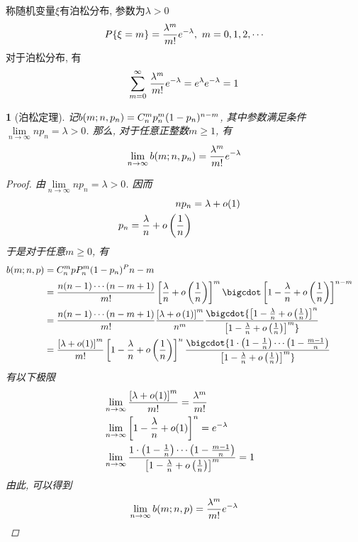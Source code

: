 \begin{poisson_distru}[泊松分布]
称随机变量\(\xi\)有泊松分布, 参数为\(\lambda > 0\)
\begin{align}
P\{\xi = m\} = {\lambda^m\over m!}e^{-\lambda},\,\, m = 0, 1, 2, \cdots
\end{align}
对于泊松分布, 有
\begin{align*}
\sum\limits_{m = 0}^\infty\,{\lambda^m\over m!}e^{-\lambda} = e^\lambda e^{-\lambda} = 1
\end{align*}
\end{poisson_distru}

\newtheorem{poisson_theorem}[theorem_root]{\theorem}
\begin{poisson_theorem}[泊松定理]
记\(b(m; n,p_n) = C_{n}^{m}p^m_n(1-p_n)^{n-m}\), 其中参数满足条件
\(\lim\limits_{n\to\infty}np_n = \lambda > 0\). 那么, 对于任意正整数\(m\ge 1\),
有
\begin{align}
\lim\limits_{n\to\infty}b(m; n, p_n) = {\lambda^m\over m!}e^{-\lambda}
\end{align}
\begin{proof}
由\(\lim\limits_{n\to\infty}np_n = \lambda > 0\). 因而
\begin{align}
    np_n &= \lambda + o(1)\cr
    p_n = {\lambda\over n} + o\left({1\over n}\right)
\end{align}
于是对于任意\(m\ge 0\), 有
\begin{align}
    b(m; n, p) &= \cbnt{n}{m}pP^m_n(1-p_n)^P{n-m}\cr
    &= {n(n-1)\cdots(n-m+1)\over m!}\left[{\lambda\over n} + o\left(1\over n\right)\right]^m\bigcdot\left[1-{\lambda\over n} + o\left({1\over n}\right)\right]^{n-m}\cr
    &= {n(n-1)\cdots(n-m+1)\over m!}{\left[\lambda + o\left(1\right)\right]^m\over n^m}\bigcdot{\left[1-{\lambda\over n} + o\left({1\over n}\right)\right]^{n}\over\left[1-{\lambda\over n} + o\left({1\over n}\right)\right]^{m}}\cr
    &= {\left[\lambda + o(1)\right]^m\over m!}\left[1-{\lambda\over n} + o\left({1\over n}\right)\right]^n\bigcdot{1\cdot\left(1-{1\over n}\right)\cdots\left(1-{m - 1\over n}\right)\over \left[1-{\lambda\over n} + o\left({1\over n}\right)\right]^m}
\end{align}
有以下极限
\begin{align}
&\lim\limits_{n\to\infty}{\left[\lambda + o(1)\right]^m\over m!} = {\lambda^m\over m!}\cr
&\lim\limits_{n\to\infty}\left[1 - {\lambda\over n} + o(1)\right]^n = e^{-\lambda}\cr
&\lim\limits_{n\to\infty}{1\cdot\left(1 - {1\over n}\right)\cdots\left(1 - {m - 1\over n}\right)\over \left[1 - {\lambda\over n} + o\left({1\over n}\right)\right]^m} = 1
\end{align}
由此, 可以得到
\begin{align}
\lim\limits_{n\to\infty}b(m;n,p) = {\lambda^m\over m!}e^{-\lambda}
\end{align}
\end{proof}
\end{poisson_theorem}

